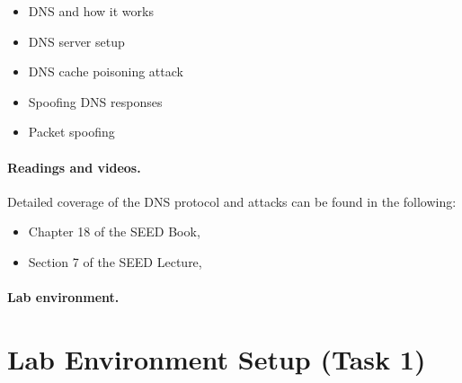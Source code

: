 \begin{itemize}[noitemsep]
\item DNS and how it works
\item DNS server setup
\item DNS cache poisoning attack
\item Spoofing DNS responses
\item Packet spoofing
\end{itemize}


\paragraph{Readings and videos.}
Detailed coverage of the DNS protocol and attacks can be found in the following:

\begin{itemize}
\item Chapter 18 of the SEED Book, \seedbook
\item Section 7 of the SEED Lecture, \seedisvideo
\end{itemize}


\paragraph{Lab environment.} \seedenvironmentC


\begin{comment}
\vspace{0.2in}
\noindent
\fbox{\parbox{\textwidth}{
\noindent
\textbf{Customization.}
In this lab description, we use the domain \texttt{attacker32.com} to refer to the
domain controlled by the attacker. When students do this lab, they are not allowed
to use this name; instead, they should use a domain name that includes their last names.
The objective of this requirement is to differentiate student's work. Since 
the domain name is only visible inside the lab environment, not to the
public, any name, including those already owned by others, can be used
safely in this lab. 
}}
\end{comment}




\section{Lab Environment Setup (Task 1)}
\label{sec:environment}

